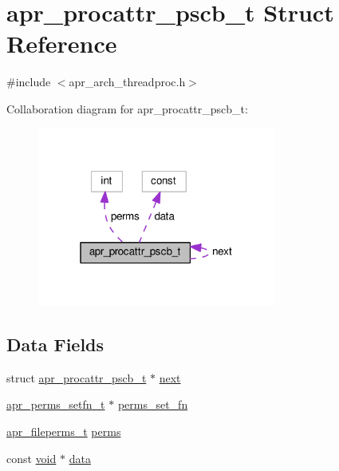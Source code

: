 \hypertarget{structapr__procattr__pscb__t}{}\section{apr\+\_\+procattr\+\_\+pscb\+\_\+t Struct Reference}
\label{structapr__procattr__pscb__t}


{\ttfamily \#include $<$apr\+\_\+arch\+\_\+threadproc.\+h$>$}



Collaboration diagram for apr\+\_\+procattr\+\_\+pscb\+\_\+t\+:
\nopagebreak
\begin{figure}[H]
\begin{center}
\leavevmode
\includegraphics[width=223pt]{structapr__procattr__pscb__t__coll__graph}
\end{center}
\end{figure}
\subsection*{Data Fields}
\begin{DoxyCompactItemize}
\item 
struct \hyperlink{structapr__procattr__pscb__t}{apr\+\_\+procattr\+\_\+pscb\+\_\+t} $\ast$ \hyperlink{structapr__procattr__pscb__t_a71bc74568c4ac1851f8a24dd40c946de}{next}
\item 
\hyperlink{group__apr__perms__set_ga65b3990e3ff0b2e9e3c3ebe417c464be}{apr\+\_\+perms\+\_\+setfn\+\_\+t} $\ast$ \hyperlink{structapr__procattr__pscb__t_aab7ac16eaa53ac21853d55015d713068}{perms\+\_\+set\+\_\+fn}
\item 
\hyperlink{group__apr__file__info_ga3af19c4c47007169064a70f9351bc7d8}{apr\+\_\+fileperms\+\_\+t} \hyperlink{structapr__procattr__pscb__t_aa363acd2012e50d7a3f22ddaaec7ab21}{perms}
\item 
const \hyperlink{group__MOD__ISAPI_gacd6cdbf73df3d9eed42fa493d9b621a6}{void} $\ast$ \hyperlink{structapr__procattr__pscb__t_aec8e4133ebc56c855cd8cc2179e44813}{data}
\end{DoxyCompactItemize}


